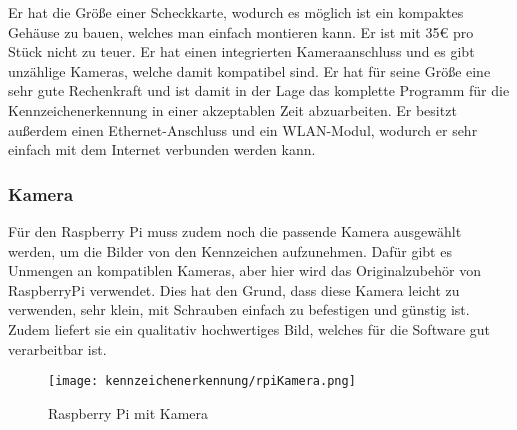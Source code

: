 Er hat die Größe einer Scheckkarte, wodurch es möglich ist ein kompaktes Gehäuse zu bauen, welches man einfach montieren kann. 
Er ist mit 35€ pro Stück nicht zu teuer. Er hat einen integrierten Kameraanschluss und es gibt unzählige Kameras, welche damit 
kompatibel sind. Er hat für seine Größe eine sehr gute Rechenkraft und ist damit in der Lage das komplette Programm für die 
Kennzeichenerkennung in einer akzeptablen Zeit abzuarbeiten. Er besitzt außerdem einen Ethernet-Anschluss und ein WLAN-Modul, 
wodurch er sehr einfach mit dem Internet verbunden werden kann.

\subsubsection{Kamera}
Für den Raspberry Pi muss zudem noch die passende Kamera ausgewählt werden, um die Bilder von den Kennzeichen aufzunehmen. 
Dafür gibt es Unmengen an kompatiblen Kameras, aber hier wird das Originalzubehör von RaspberryPi verwendet. Dies hat den Grund, 
dass diese Kamera leicht zu verwenden, sehr klein, mit Schrauben einfach zu befestigen und günstig ist. Zudem liefert sie ein 
qualitativ hochwertiges Bild, welches für die Software gut verarbeitbar ist.

\begin{figure}[H]
    \centering
    \texttt{[image: kennzeichenerkennung/rpiKamera.png]}
    \caption{Raspberry Pi mit Kamera}
\end{figure}